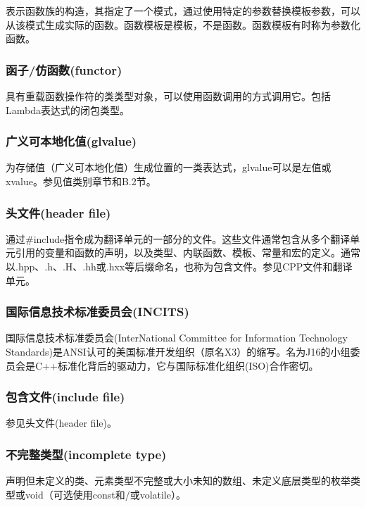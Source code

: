 表示函数族的构造，其指定了一个模式，通过使用特定的参数替换模板参数，可以从该模式生成实际的函数。函数模板是模板，不是函数。函数模板有时称为参数化函数。

\subsubsection{函子/仿函数(functor)}

具有重载函数操作符的类类型对象，可以使用函数调用的方式调用它。包括Lambda表达式的闭包类型。

\subsubsection{广义可本地化值(glvalue)}

为存储值（广义可本地化值）生成位置的一类表达式，glvalue可以是左值或xvalue。参见值类别章节和B.2节。

\subsubsection{头文件(header file)}

通过\#include指令成为翻译单元的一部分的文件。这些文件通常包含从多个翻译单元引用的变量和函数的声明，以及类型、内联函数、模板、常量和宏的定义。通常以.hpp、.h、.H、.hh或.hxx等后缀命名，也称为包含文件。参见CPP文件和翻译单元。

\subsubsection{国际信息技术标准委员会(INCITS)}

国际信息技术标准委员会(InterNational Committee for Information Technology Standards)是ANSI认可的美国标准开发组织（原名X3）的缩写。名为J16的小组委员会是C++标准化背后的驱动力，它与国际标准化组织(ISO)合作密切。

\subsubsection{包含文件(include file)}

参见头文件(header file)。

\subsubsection{不完整类型(incomplete type)}

声明但未定义的类、元素类型不完整或大小未知的数组、未定义底层类型的枚举类型或void（可选使用const和/或volatile）。

